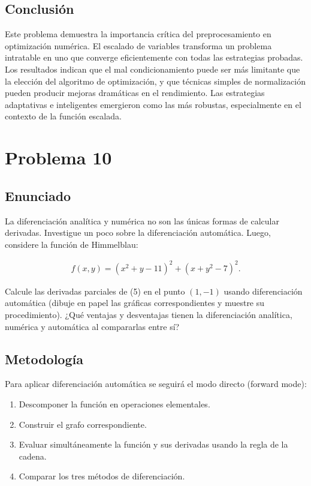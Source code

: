 \documentclass{article}
\begin{document}
\subsection{Conclusión}

Este problema demuestra la importancia crítica del preprocesamiento en optimización numérica. El escalado de variables transforma un problema intratable en uno que converge eficientemente con todas las estrategias probadas. Los resultados indican que el mal condicionamiento puede ser más limitante que la elección del algoritmo de optimización, y que técnicas simples de normalización pueden producir mejoras dramáticas en el rendimiento. Las estrategias adaptativas e inteligentes emergieron como las más robustas, especialmente en el contexto de la función escalada.

\section{Problema 10}

\subsection{Enunciado}
La diferenciación analítica y numérica no son las únicas formas de calcular derivadas. Investigue un poco sobre la diferenciación automática. Luego, considere la función de Himmelblau:

\begin{align}
    f(x,y) = (x^{2} + y - 11)^{2} + (x + y^{2} - 7)^{2}. \tag{5}
\end{align}

Calcule las derivadas parciales de (5) en el punto $(1,-1)$ usando diferenciación automática (dibuje en papel las gráficas correspondientes y muestre su procedimiento). ¿Qué ventajas y desventajas tienen la diferenciación analítica, numérica y automática al compararlas entre sí?

\subsection{Metodología}

Para aplicar diferenciación automática se seguirá el modo directo (forward mode):
\begin{enumerate}
    \item Descomponer la función en operaciones elementales.
    \item Construir el grafo correspondiente.
    \item Evaluar simultáneamente la función y sus derivadas usando la regla de la cadena.
    \item Comparar los tres métodos de diferenciación.
\end{enumerate}
\end{document}
